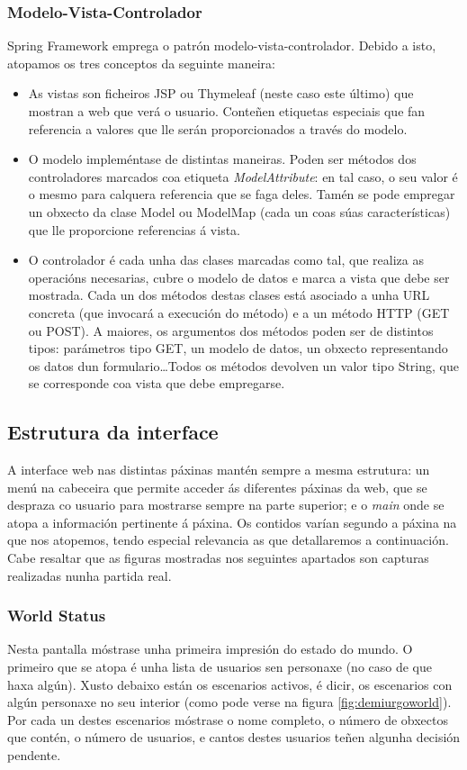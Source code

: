 \subsubsection{Modelo-Vista-Controlador}
Spring Framework emprega o patrón modelo-vista-controlador. Debido a isto,
atopamos os tres conceptos da seguinte maneira:
\begin{itemize}
  \item As vistas son ficheiros JSP ou Thymeleaf (neste caso este último) que
  mostran a web que verá o usuario. Conteñen etiquetas especiais que fan
  referencia a valores que lle serán proporcionados a través do modelo.
  \item O modelo impleméntase de distintas maneiras. Poden ser métodos dos
  controladores marcados coa etiqueta \textit{ModelAttribute}: en tal caso, o
  seu valor é o mesmo para calquera referencia que se faga deles. Tamén se pode
  empregar un obxecto da clase Model ou ModelMap (cada un coas súas
  características) que lle proporcione referencias á vista.
  \item O controlador é cada unha das clases marcadas como tal, que realiza as
  operacións necesarias, cubre o modelo de datos e marca a vista que debe ser
  mostrada. Cada un dos métodos destas clases está asociado a unha URL concreta
  (que invocará a execución do método) e a un método HTTP (GET ou POST). A
  maiores, os argumentos dos métodos poden ser de distintos tipos: parámetros
  tipo GET, un modelo de datos, un obxecto representando os datos dun
  formulario\ldots Todos os métodos devolven un valor tipo String, que se
  corresponde coa vista que debe empregarse.
\end{itemize}

\subsection{Estrutura da interface}
A interface web nas distintas páxinas mantén sempre a mesma estrutura: un menú
na cabeceira que permite acceder ás diferentes páxinas da web, que se despraza
co usuario para mostrarse sempre na parte superior; e o \textit{main} onde se
atopa a información pertinente á páxina. Os contidos varían segundo a páxina
na que nos atopemos, tendo especial relevancia as que detallaremos a
continuación. Cabe resaltar que as figuras mostradas nos seguintes apartados son
capturas realizadas nunha partida real.

\subsubsection{World Status}
Nesta pantalla móstrase unha primeira impresión do estado do mundo. O primeiro
que se atopa é unha lista de usuarios sen personaxe (no caso de que haxa algún).
Xusto debaixo están os escenarios activos, é dicir, os escenarios con algún
personaxe no seu interior (como pode verse na figura \ref{fig:demiurgoworld}).
Por cada un destes escenarios móstrase o nome completo, o número de obxectos que
contén, o número de usuarios, e cantos destes usuarios teñen algunha decisión
pendente.

